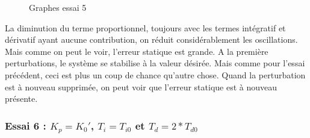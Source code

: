 \begin{figure}[H]
    \centering
    \caption{Graphes essai 5}
    \label{fig:essai-5}
\end{figure}

La diminution du terme proportionnel, toujours avec les termes intégratif et dérivatif
ayant aucune contribution, on réduit considérablement les oscillations. Mais
comme on peut le voir, l'erreur statique est grande. A la première perturbations,
le système se stabilise à la valeur désirée. Mais comme pour l'essai précédent,
ceci est plus un coup de chance qu'autre chose. Quand la perturbation est à nouveau
supprimée, on peut voir que l'erreur statique est à nouveau présente.


\subsubsection{Essai 6 : $K_{p} = K_{0}'$, $T_{i} = T_{i0}$ et $T_{d} = 2*T_{d0}$}


